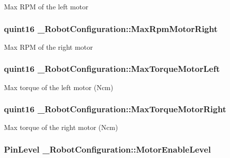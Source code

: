 Max R\-P\-M of the left motor \hypertarget{struct___robot_configuration_a410e871a1f0c5d0a9a06f57f584b1407}{
\subsubsection[{Max\-Rpm\-Motor\-Right}]{\setlength{\rightskip}{0pt plus 5cm}quint16 \-\_\-\-Robot\-Configuration\-::\-Max\-Rpm\-Motor\-Right}}\label{struct___robot_configuration_a410e871a1f0c5d0a9a06f57f584b1407}
Max R\-P\-M of the right motor \hypertarget{struct___robot_configuration_a5c556f8da91c14e17b2150f5b9a9ed26}{
\subsubsection[{Max\-Torque\-Motor\-Left}]{\setlength{\rightskip}{0pt plus 5cm}quint16 \-\_\-\-Robot\-Configuration\-::\-Max\-Torque\-Motor\-Left}}\label{struct___robot_configuration_a5c556f8da91c14e17b2150f5b9a9ed26}
Max torque of the left motor (Ncm) \hypertarget{struct___robot_configuration_a3d3d5e740395408ba0ee9d108c68fcb9}{
\subsubsection[{Max\-Torque\-Motor\-Right}]{\setlength{\rightskip}{0pt plus 5cm}quint16 \-\_\-\-Robot\-Configuration\-::\-Max\-Torque\-Motor\-Right}}\label{struct___robot_configuration_a3d3d5e740395408ba0ee9d108c68fcb9}
Max torque of the right motor (Ncm) \hypertarget{struct___robot_configuration_a44c8ef3ff07fc7f7c00489b76c73e738}{
\subsubsection[{Motor\-Enable\-Level}]{\setlength{\rightskip}{0pt plus 5cm}Pin\-Level \-\_\-\-Robot\-Configuration\-::\-Motor\-Enable\-Level}}\label{struct___robot_configuration_a44c8ef3ff07fc7f7c00489b76c73e738}
